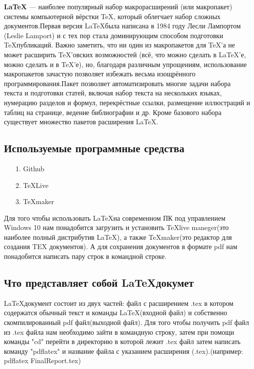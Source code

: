 \documentclass[14pt, a4paper]{extarticle}
\begin{document}
\textbf{\LaTeX} — наиболее популярный набор макрорасширений (или макропакет) системы компьютерной вёрстки \TeX, который облегчает набор сложных документов.Первая версия \LaTeX была написана в 1984 году Лесли Лампортом (Leslie Lamport) и с тех пор стала доминирующим способом подготовки \TeX публикаций. Важно заметить, что ни один из макропакетов для \TeX ’а не может расширить \TeX ’овских возможностей (всё, что можно сделать в LaTeX’е, можно сделать и в \TeX ’е), но, благодаря различным упрощениям, использование макропакетов зачастую позволяет избежать весьма изощрённого программирования.Пакет позволяет автоматизировать многие задачи набора текста и подготовки статей, включая набор текста на нескольких языках, нумерацию разделов и формул, перекрёстные ссылки, размещение иллюстраций и таблиц на странице, ведение библиографии и др. Кроме базового набора существует множество пакетов расширения \LaTeX.

\subsection{Используемые программные средства}
\begin{itemize}
\item[1.]Github

\item[2.]\TeX Live

\item[3.]\TeX maker
\end{itemize}
Для того чтобы использовать \LaTeX на современном ПК под управлением Windows 10 нам понадобится загрузить и установить \TeX live maneger(это наиболее полный дистрибутив \LaTeX), а также \TeX maker(это редактор для создания TEX документов). А для сохранения документов в формате pdf нам понадобится написать пару строк в командной строке.

\subsection{Что представляет собой \LaTeX докумет}
\LaTeX документ состоит из двух частей: файл с расширением .tex в котором содержатся обычный текст и команды \LaTeX(входной файл) и собственно скомпилированный pdf файл(выходной файл). Для того чтобы получить pdf файл из .tex файла нам необходимо зайти в командную строку, затем при помощи команды "cd" перейти в директорию в которой лежит .tex файл затем написать команду "pdflatex" и название файла с указанием расширения (.tex).(например: pdflatex FinalReport.tex)
\end{document}
